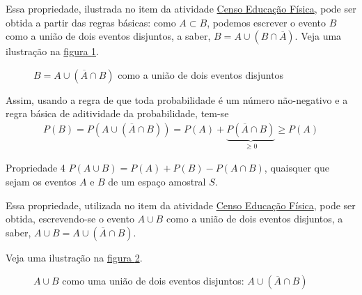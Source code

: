 Essa propriedade, ilustrada no item  da atividade \hyperref[censo-educacao-fisica]{Censo Educação Física}, pode ser obtida a partir das regras básicas:
como \(A\subset B\), podemos escrever o evento \(B\) como a união de dois eventos disjuntos, a saber,  \(B=A\cup (B\cap \overline{A})\). Veja uma ilustração na \hyperref[eventosdijuntos]{figura \ref{eventosdijuntos}}.
\begin{figure}[H]
\centering

\caption{\(B=A\cup (\overline{A}\cap B)\) como a união de dois eventos disjuntos}
\label{eventosdijuntos}
\end{figure}

\clearpage

Assim, usando a regra de que toda probabilidade é um número não-negativo e a regra básica de aditividade da probabilidade, tem-se
\begin{equation*}
\begin{split}P(B)=P(A\cup(\overline{A}\cap B))=P(A)+\underbrace{P(\overline{A}\cap B)}_{\geq 0}\geq P(A)\end{split}
\end{equation*}
\begin{observationtitle}{Propriedade 4}
\(P(A\cup B)=P(A)+P(B)-P(A\cap B)\), quaisquer que sejam os eventos \(A\) e \(B\) de um espaço amostral \(S\).
\end{observationtitle}

Essa propriedade, utilizada no item  da atividade \hyperref[censo-educacao-fisica]{Censo Educação Física}, pode ser obtida, escrevendo-se o evento \(A\cup B\) como a união de dois eventos disjuntos, a saber, \(A\cup B=A\cup (\overline{A}\cap B)\).

Veja uma ilustração na \hyperref[eventosdijuntos2]{figura \ref{eventosdijuntos2}}.
\begin{figure}[H]
\centering


\caption{\(A\cup B\) como uma união de dois eventos disjuntos: \(A\cup (\overline{A}\cap B)\)}
\label{eventosdijuntos2}
\end{figure}


